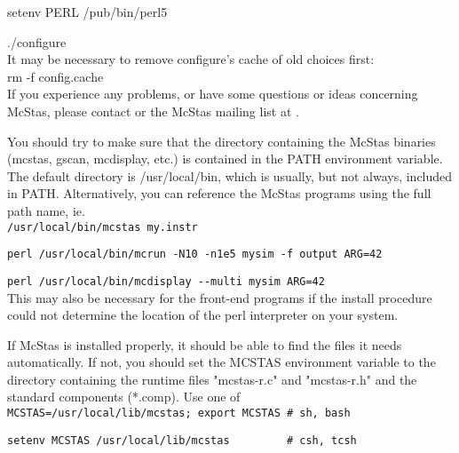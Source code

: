     setenv PERL /pub/bin/perl5

    ./configure\\

\noindent It may be necessary to remove configure's cache of old
choices first:\\


    rm -f config.cache\\


\noindent If you experience any problems, or have some questions or ideas
concerning McStas, please contact
or the McStas mailing list at .

You should try to make sure that the directory containing the McStas
binaries (mcstas, gscan, mcdisplay, etc.) is contained in the PATH
environment variable. The default directory is /usr/local/bin, which is
usually, but not always, included in PATH. Alternatively, you can
reference the McStas programs using the full path name, ie.\\

  \verb+/usr/local/bin/mcstas my.instr+

  \verb+perl /usr/local/bin/mcrun -N10 -n1e5 mysim -f output ARG=42+

  \verb+perl /usr/local/bin/mcdisplay --multi mysim ARG=42+\\

This may also be necessary for the front-end programs if the install
procedure could not determine the location of the perl interpreter on
your system.

If McStas is installed properly, it should be able to find the files it
needs automatically. If not, you should set the MCSTAS environment
variable to the directory containing the runtime files "mcstas-r.c" and
"mcstas-r.h" and the standard components (*.comp). Use one of\\

  \verb+MCSTAS=/usr/local/lib/mcstas; export MCSTAS # sh, bash+

  \verb+setenv MCSTAS /usr/local/lib/mcstas         # csh, tcsh+\\

%
%
%


